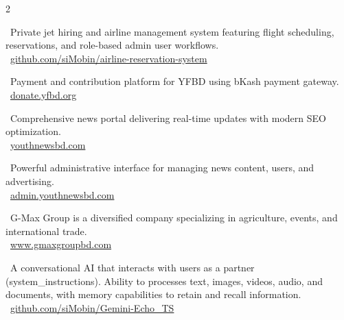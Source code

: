 \begin{paracol}{2}
    \divider

    \small \faChevronRight \ Private jet hiring and airline management system featuring flight scheduling, reservations, and role-based admin user workflows. \\[0.5em]
    \small \faGithub \ \href{https://github.com/siMobin/airline-reservation-system}{github.com/siMobin/airline-reservation-system}

    \switchcolumn

    \small \faChevronRight \ Payment and contribution platform for YFBD using bKash payment gateway. \\[0.5em]
    \small \faGlobe \ \href{https://donate.yfbd.org/}{donate.yfbd.org}

    \divider

    \small \faChevronRight \ Comprehensive news portal delivering real-time updates with modern SEO optimization. \\[0.5em]
    \small \faGlobe \ \href{https://youthnewsbd.com}{youthnewsbd.com}

    \divider

    \small \faChevronRight \ Powerful administrative interface for managing news content, users, and advertising. \\[0.5em]
    \small \faGlobe \ \href{https://admin.youthnewsbd.com}{admin.youthnewsbd.com}

    \divider

    \small \faChevronRight \ G-Max Group is a diversified company specializing in agriculture, events, and international trade. \\[0.5em]
    \small \faGlobe \ \href{https://www.gmaxgroupbd.com/}{www.gmaxgroupbd.com}

    \divider

    \small \faChevronRight \ A conversational AI that interacts with users as a \faVenus partner (system\_instructions). Ability to processes text, images, videos, audio, and documents, with memory capabilities to retain and recall information. \\[0.5em]
    \small \faGithub \ \href{https://github.com/siMobin/Gemini-Echo\_TS}{github.com/siMobin/Gemini-Echo\_TS}


\end{paracol}
